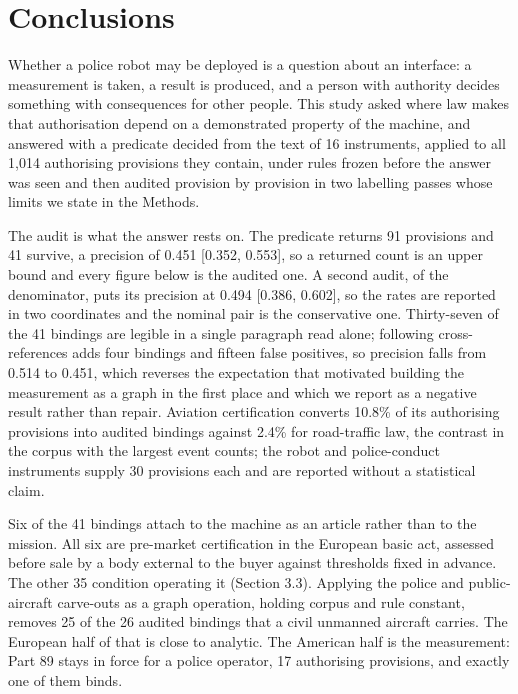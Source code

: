 \section{Conclusions}\label{sec:5}

Whether a police robot may be deployed is a question about an interface: a measurement is taken, a result is produced, and a person with authority decides something with consequences for other people. This study asked where law makes that authorisation depend on a demonstrated property of the machine, and answered with a predicate decided from the text of 16 instruments, applied to all 1,014 authorising provisions they contain, under rules frozen before the answer was seen and then audited provision by provision in two labelling passes whose limits we state in the Methods.

The audit is what the answer rests on. The predicate returns 91 provisions and 41 survive, a precision of 0.451 [0.352, 0.553], so a returned count is an upper bound and every figure below is the audited one. A second audit, of the denominator, puts its precision at 0.494 [0.386, 0.602], so the rates are reported in two coordinates and the nominal pair is the conservative one. Thirty-seven of the 41 bindings are legible in a single paragraph read alone; following cross-references adds four bindings and fifteen false positives, so precision falls from 0.514 to 0.451, which reverses the expectation that motivated building the measurement as a graph in the first place and which we report as a negative result rather than repair. Aviation certification converts 10.8\% of its authorising provisions into audited bindings against 2.4\% for road-traffic law, the contrast in the corpus with the largest event counts; the robot and police-conduct instruments supply 30 provisions each and are reported without a statistical claim.

Six of the 41 bindings attach to the machine as an article rather than to the mission. All six are pre-market certification in the European basic act, assessed before sale by a body external to the buyer against thresholds fixed in advance. The other 35 condition operating it (Section 3.3). Applying the police and public-aircraft carve-outs as a graph operation, holding corpus and rule constant, removes 25 of the 26 audited bindings that a civil unmanned aircraft carries. The European half of that is close to analytic. The American half is the measurement: Part 89 stays in force for a police operator, 17 authorising provisions, and exactly one of them binds.


